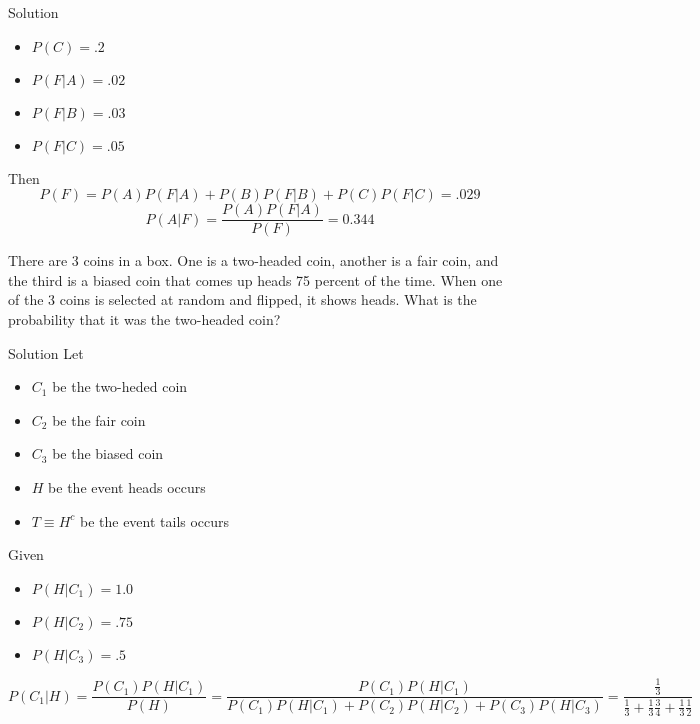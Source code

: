 \documentclass{article}
\begin{document}
\begin{spacing}{1.1}
\begin{homeworkProblem}
\begin{homeworkSection}{Solution}
\begin{itemize}
      \item $P( C) = .2$
      \item $P( F|A) = .02$
      \item $P( F|B) = .03$
      \item $P( F|C) = .05$
    \end{itemize}
    Then
      \[P( F) = P( A)P( F|A) + P( B)P( F|B) + P( C)P( F|C) = .029\]
      \[P( A|F)= \frac{ P( A)P( F|A)}{ P( F)} = 0.344\]
  \end{homeworkSection}
\end{homeworkProblem}
\newpage
\begin{homeworkProblem}
  There are 3 coins in a box. One is a two-headed coin, another is a fair coin, 
  and the third is a biased coin that comes up heads 75 percent of the time. 
  When one of the 3 coins is selected at random and flipped, it shows heads. 
  What is the probability that it was the two-headed coin? 

  \begin{homeworkSection}{Solution}
   Let
  \begin{itemize}
    \item $C_1$ be the two-heded coin
    \item $C_2$ be the fair coin
    \item $C_3$ be the biased coin
    \item $H$ be the event heads occurs
    \item $T \equiv H^c$ be the event tails occurs
  \end{itemize}
  Given
  \begin{itemize}
    \item $P( H|C_1) = 1.0$
    \item $P( H|C_2) = .75$
    \item $P( H|C_3) = .5$
  \end{itemize}

  \[P( C_1|H) = \frac{ P( C_1) P( H|C_1)}{ P( H)} 
  = \frac{ P( C_1) P( H|C_1)}{ P( C_1) P( H|C_1) + P( C_2) P( H|C_2) + P( C_3) P( H|C_3)} 
  = \frac{ \frac{ 1}{ 3}}{ \frac{ 1}{ 3} + \frac{ 1}{ 3} \frac{ 3}{ 4} + \frac{ 1}{ 3} \frac{ 1}{ 2}}\]
    
  \end{homeworkSection}
\end{homeworkProblem}
\end{spacing}
\end{document}

